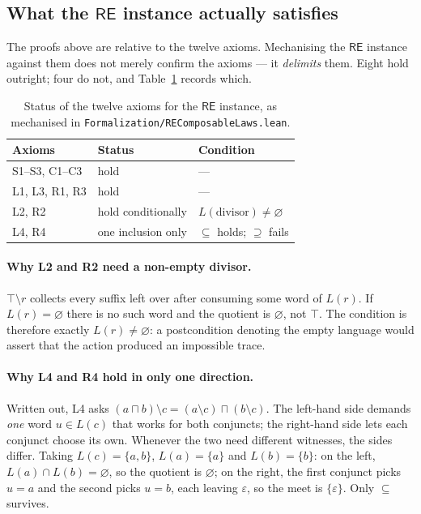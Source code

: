 \documentclass[acmsmall,screen]{acmart}
\newcommand{\RE}{\mathsf{RE}}
\newcommand{\lquot}{\mathbin{\setminus}}   %
\begin{document}
\subsection{What the \texorpdfstring{$\RE$}{RE} instance actually satisfies}
\label{sec:boundary}

The proofs above are relative to the twelve axioms.
Mechanising the $\RE$ instance against them does not merely confirm the
axioms --- it \emph{delimits} them.
Eight hold outright; four do not, and Table~\ref{tab:axiom-status} records
which.

\begin{table}[ht]
\caption{Status of the twelve axioms for the $\RE$ instance, as mechanised
         in \texttt{Formalization/REComposableLaws.lean}.}
\label{tab:axiom-status}
\small
\begin{tabular}{lll}
\toprule
Axioms & Status & Condition \\
\midrule
S1--S3, C1--C3 & hold & --- \\
L1, L3, R1, R3 & hold & --- \\
L2, R2         & hold conditionally & $L(\text{divisor}) \neq \varnothing$ \\
L4, R4         & one inclusion only & $\subseteq$ holds; $\supseteq$ fails \\
\bottomrule
\end{tabular}
\end{table}

\paragraph{Why L2 and R2 need a non-empty divisor.}
$\top \lquot r$ collects every suffix left over after consuming some word of
$L(r)$.
If $L(r) = \varnothing$ there is no such word and the quotient is
$\varnothing$, not $\top$.
The condition is therefore exactly $L(r) \neq \varnothing$: a postcondition
denoting the empty language would assert that the action produced an
impossible trace.

\paragraph{Why L4 and R4 hold in only one direction.}
Written out, L4 asks
$(a \sqcap b) \lquot c = (a \lquot c) \sqcap (b \lquot c)$.
The left-hand side demands \emph{one} word $u \in L(c)$ that works for both
conjuncts; the right-hand side lets each conjunct choose its own.
Whenever the two need different witnesses, the sides differ.
Taking $L(c) = \{a, b\}$, $L(a) = \{a\}$ and $L(b) = \{b\}$:
on the left, $L(a) \cap L(b) = \varnothing$, so the quotient is
$\varnothing$;
on the right, the first conjunct picks $u = a$ and the second picks
$u = b$, each leaving $\varepsilon$, so the meet is $\{\varepsilon\}$.
Only $\subseteq$ survives.
\end{document}
